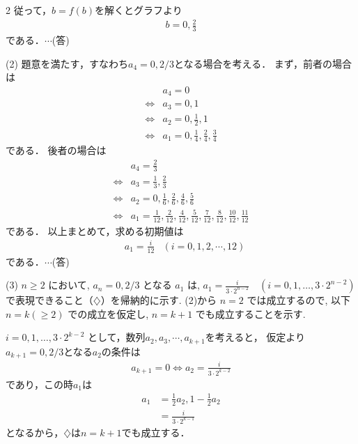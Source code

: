 \documentclass[../../../../main.tex]{subfiles}
\begin{document}
\begin{multicols}{2}
  従って，$b=f(b)$を解くとグラフより
  \begin{align*}
    b = 0, \frac{2}{3}
  \end{align*}
  である．$\cdots$(答)

  \vspace{10pt}
  (2)
  題意を満たす，すなわち$a_4=0,2/3$となる場合を考える．
  まず，前者の場合は
  \begin{align*}
     & a_4=0                                          \\
    \iff
     & a_3=0, 1                                       \\
    \iff
     & a_2 = 0, \frac{1}{2}, 1                        \\
    \iff
     & a_1 = 0, \frac{1}{4}, \frac{2}{4}, \frac{3}{4}
  \end{align*}
  である．
  後者の場合は
  \begin{align*}
     & a_4=\frac{2}{3}                                                                                                        \\
    \iff
     & a_3= \frac{1}{3}, \frac{2}{3}                                                                                          \\
    \iff
     & a_2=0, \frac{1}{6}, \frac{2}{6},\frac{4}{6}, \frac{5}{6}                                                               \\
    \iff
     & a_1 = \frac{1}{12}, \frac{2}{12}, \frac{4}{12}, \frac{5}{12}, \frac{7}{12}, \frac{8}{12}, \frac{10}{12}, \frac{11}{12}
  \end{align*}
  である．
  以上まとめて，求める初期値は
  \begin{align*}
     & a_1 = \frac{i}{12} & (i=0,1,2,\cdots,12)
  \end{align*}
  である．$\cdots$(答)

  \vspace{10pt}
  (3)
  $n \ge 2$ において, $a_n=0,2/3$ となる $a_1$ は, $a_1 = \frac{i}{3 \cdot 2^{n-2}} \quad (i=0,1,\dots,3 \cdot 2^{n-2})$ で表現できること（$\diamondsuit$）を帰納的に示す.
  (2)から $n=2$ では成立するので, 以下 $n=k (\ge 2)$ での成立を仮定し, $n=k+1$ でも成立することを示す.

  $i=0,1,\dots,3 \cdot 2^{k-2}$ として，数列$a_2,a_3,\cdots,a_{k+1}$を考えると，
  仮定より$a_{k+1}=0,2/3$となる$a_2$の条件は
  \begin{align*}
    a_{k+1}=0 \iff a_{2} = \frac{i}{3 \cdot 2^{k-2}}
  \end{align*}
  であり，この時$a_1$は
  \begin{align*}
    a_1
     & = \frac{1}{2}a_{2}, 1-\frac{1}{2}a_{2} \\
     & = \frac{i}{3 \cdot 2^{k-1}}
  \end{align*}
  となるから，$\diamondsuit$は$n=k+1$でも成立する．


\end{multicols}
\end{document}

